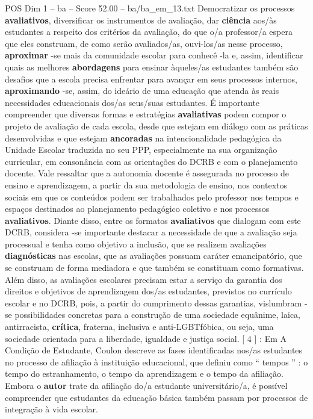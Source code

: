 \begin{textsample}{POS Dim 1 – ba – Score 52.00 – ba/ba\_em\_13.txt}
Democratizar os processos \textbf{avaliativos}, diversificar os instrumentos de avaliação, dar \textbf{ciência} aos/às estudantes a respeito dos critérios da avaliação, do que o/a professor/a espera que eles construam, de como serão avaliados/as, ouvi-los/as nesse processo, \textbf{aproximar} -se mais da comunidade escolar para conhecê -la e, assim, identificar quais as melhores \textbf{abordagens} para ensinar àqueles/as estudantes também são desafios que a escola precisa enfrentar para avançar em seus processos internos, \textbf{aproximando} -se, assim, do ideário de uma educação que atenda às reais necessidades educacionais dos/as seus/suas estudantes.
É importante compreender que diversas formas e estratégias \textbf{avaliativas} podem compor o projeto de avaliação de cada escola, desde que estejam em diálogo com as práticas desenvolvidas e que estejam \textbf{ancoradas} na intencionalidade pedagógica da Unidade Escolar traduzida no seu PPP, especialmente na sua organização curricular, em consonância com as orientações do DCRB e com o planejamento docente.
Vale ressaltar que a autonomia docente é assegurada no processo de ensino e aprendizagem, a partir da sua metodologia de ensino, nos contextos sociais em que os conteúdos podem ser trabalhados pelo professor nos tempos e espaços destinados ao planejamento pedagógico coletivo e nos processos \textbf{avaliativos}.
Diante disso, entre os formatos \textbf{avaliativos} que dialogam com este DCRB, considera -se importante destacar a necessidade de que a avaliação seja processual e tenha como objetivo a inclusão, que se realizem avaliações \textbf{diagnósticas} nas escolas, que as avaliações possuam caráter emancipatório, que se construam de forma mediadora e que também se constituam como formativas.
Além disso, as avaliações escolares precisam estar a serviço da garantia dos direitos e objetivos de aprendizagem dos/as estudantes, previstos no currículo escolar e no DCRB, pois, a partir do cumprimento dessas garantias, vislumbram -se possibilidades concretas para a construção de uma sociedade equânime, laica, antirracista, \textbf{crítica}, fraterna, inclusiva e anti-LGBTfóbica, ou seja, uma sociedade orientada para a liberdade, igualdade e justiça social. [ 4 ] : Em A Condição de Estudante, Coulon descreve as fases identificadas nos/as estudantes no processo de afiliação à instituição educacional, que definiu como “ tempos ” : o tempo do estranhamento, o tempo da aprendizagem e o tempo da afiliação.
Embora o \textbf{autor} trate da afiliação do/a estudante universitário/a, é possível compreender que estudantes da educação básica também passam por processos de integração à vida escolar.

\end{textsample}
